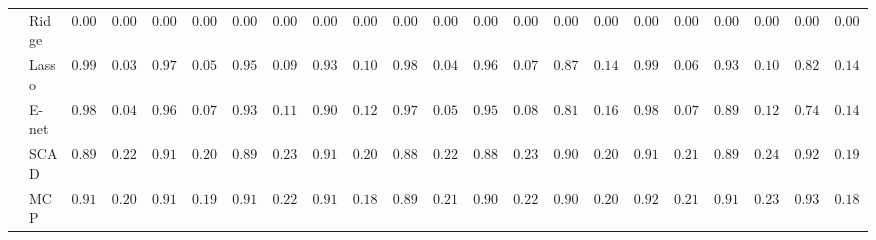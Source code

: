 \begin{tabular}{ll|ll|llllll|llllll|llllll}
 & Ridge  & $0.0000$ & $0.0000$ & $0.0000$ & $0.0000$ & $0.0000$ & $0.0000$ & $0.0000$ & $0.0000$ & $0.0000$ & $0.0000$ & $0.0000$ & $0.0000$ & $0.0000$ & $0.0000$ & $0.0000$ & $0.0000$ & $0.0000$ & $0.0000$ & $0.0000$ & $0.0000$ \\
 & Lasso  & $0.9933$ & $0.0328$ & $0.9767$ & $0.0581$ & $0.9567$ & $0.0966$ & $0.9317$ & $0.1062$ & $0.9883$ & $0.0427$ & $0.9683$ & $0.0738$ & $0.8733$ & $0.1404$ & $0.9900$ & $0.0619$ & $0.9333$ & $0.1059$ & $0.8267$ & $0.1400$ \\
 & E-net  & $0.9850$ & $0.0479$ & $0.9650$ & $0.0796$ & $0.9367$ & $0.1155$ & $0.9050$ & $0.1237$ & $0.9750$ & $0.0598$ & $0.9550$ & $0.0849$ & $0.8167$ & $0.1633$ & $0.9800$ & $0.0760$ & $0.8933$ & $0.1287$ & $0.7467$ & $0.1411$ \\
 & SCAD  & $0.8900$ & $0.2275$ & $0.9100$ & $0.2057$ & $0.8933$ & $0.2375$ & $0.9100$ & $0.2030$ & $0.8833$ & $0.2278$ & $0.8833$ & $0.2363$ & $0.9067$ & $0.2083$ & $0.9150$ & $0.2165$ & $0.8950$ & $0.2458$ & $0.9267$ & $0.1915$ \\
 & MCP  & $0.9117$ & $0.2002$ & $0.9183$ & $0.1961$ & $0.9133$ & $0.2241$ & $0.9100$ & $0.1872$ & $0.8983$ & $0.2183$ & $0.9033$ & $0.2250$ & $0.9083$ & $0.2043$ & $0.9250$ & $0.2111$ & $0.9117$ & $0.2302$ & $0.9317$ & $0.1867$ \\
\hline 
\end{tabular}

